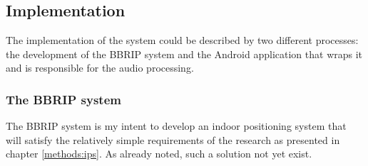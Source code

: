 \documentclass[a4paper,11pt]{article}
\begin{document}
\subsection{Implementation}

The implementation of the system could be described by two different processes: the development of the BBRIP system and the Android application that wraps it and is responsible for the audio processing.

\subsubsection{The BBRIP system}

The BBRIP system is my intent to develop an indoor positioning system that will satisfy the relatively simple requirements of the research as presented in chapter \ref{methods:ips}.
As already noted, such a solution not yet exist.
\end{document}
